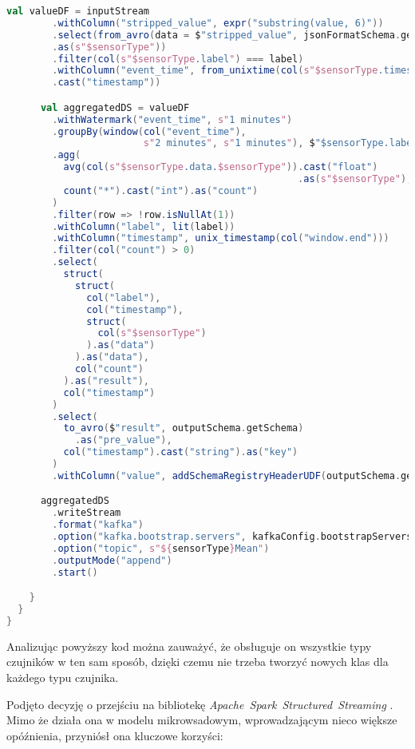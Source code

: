 \begin{lstlisting}[caption=Nowa implementacja przetwarzająca strumienie danych, label={lst:mean_processor_spark},language=Scala]
      val valueDF = inputStream
        .withColumn("stripped_value", expr("substring(value, 6)"))
        .select(from_avro(data = $"stripped_value", jsonFormatSchema.getSchema)
        .as(s"$sensorType"))
        .filter(col(s"$sensorType.label") === label)
        .withColumn("event_time", from_unixtime(col(s"$sensorType.timestamp"))
        .cast("timestamp"))

      val aggregatedDS = valueDF
        .withWatermark("event_time", s"1 minutes")
        .groupBy(window(col("event_time"), 
                        s"2 minutes", s"1 minutes"), $"$sensorType.label")
        .agg(
          avg(col(s"$sensorType.data.$sensorType")).cast("float")
                                                   .as(s"$sensorType"),
          count("*").cast("int").as("count")
        )
        .filter(row => !row.isNullAt(1))
        .withColumn("label", lit(label))
        .withColumn("timestamp", unix_timestamp(col("window.end")))
        .filter(col("count") > 0)
        .select(
          struct(
            struct(
              col("label"),
              col("timestamp"),
              struct(
                col(s"$sensorType")
              ).as("data")
            ).as("data"),
            col("count")
          ).as("result"),
          col("timestamp")
        )
        .select(
          to_avro($"result", outputSchema.getSchema)
            .as("pre_value"),
          col("timestamp").cast("string").as("key")
        )
        .withColumn("value", addSchemaRegistryHeaderUDF(outputSchema.getId)(col("pre_value")))

      aggregatedDS
        .writeStream
        .format("kafka")
        .option("kafka.bootstrap.servers", kafkaConfig.bootstrapServers)
        .option("topic", s"${sensorType}Mean")
        .outputMode("append")
        .start()

    }
  }
} 

\end{lstlisting}

Analizując powyższy kod można zauważyć, że obsługuje on wszystkie typy czujników w ten sam sposób, dzięki czemu nie trzeba tworzyć nowych klas dla każdego typu czujnika.

Podjęto decyzję o przejściu na bibliotekę \textit{\mbox{\textit{Apache Spark Structured Streaming}}} \cite{spark_streaming}. Mimo że działa ona w modelu mikrowsadowym, wprowadzającym nieco większe opóźnienia, przyniósł ona kluczowe korzyści:

\vspace{0.3em}


